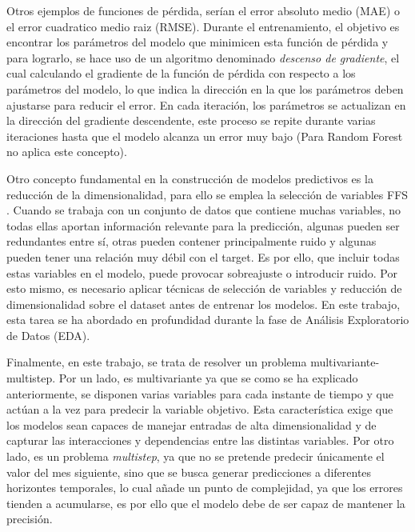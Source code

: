 Otros ejemplos de funciones de pérdida, serían el error absoluto medio (MAE) o el error cuadratico medio raiz (RMSE). Durante el entrenamiento, el objetivo es encontrar los parámetros del modelo que minimicen esta función de pérdida y para lograrlo, se hace uso de un algoritmo denominado \emph{descenso de gradiente}, el cual calculando el gradiente de la función de pérdida con respecto a los parámetros del modelo, lo que indica la dirección en la que los parámetros deben ajustarse para reducir el error. En cada iteración, los parámetros se actualizan en la dirección del gradiente descendente, este proceso se repite durante varias iteraciones hasta que el modelo alcanza un error muy bajo (Para Random Forest no aplica este concepto).

Otro concepto fundamental en la construcción de modelos predictivos es la reducción de la dimensionalidad, para ello se emplea la selección de variables FFS \cite{seleccion_var}. Cuando se trabaja con un conjunto de datos que contiene muchas variables, no todas ellas aportan información relevante para la predicción, algunas pueden ser redundantes entre sí, otras pueden contener principalmente ruido y algunas pueden tener una relación muy débil con el target. Es por ello, que incluir todas estas variables en el modelo, puede provocar sobreajuste o introducir ruido. Por esto mismo, es necesario aplicar técnicas de selección de variables y reducción de dimensionalidad sobre el dataset antes de entrenar los modelos. En este trabajo, esta tarea se ha abordado en profundidad durante la fase de Análisis Exploratorio de Datos (EDA).

Finalmente, en este trabajo, se trata de resolver un problema multivariante-multistep. Por un lado, es multivariante ya que se como se ha explicado anteriormente, se disponen varias variables para cada instante de tiempo y que actúan a la vez para predecir la variable objetivo. Esta característica exige que los modelos sean capaces de manejar entradas de alta dimensionalidad y de capturar las interacciones y dependencias entre las distintas variables. Por otro lado, es un problema \emph{multistep}, ya que no se pretende predecir únicamente el valor del mes siguiente, sino que se busca generar predicciones a diferentes horizontes temporales, lo cual añade un punto de complejidad, ya que los errores tienden a acumularse, es por ello que el modelo debe de ser capaz de mantener la precisión.

